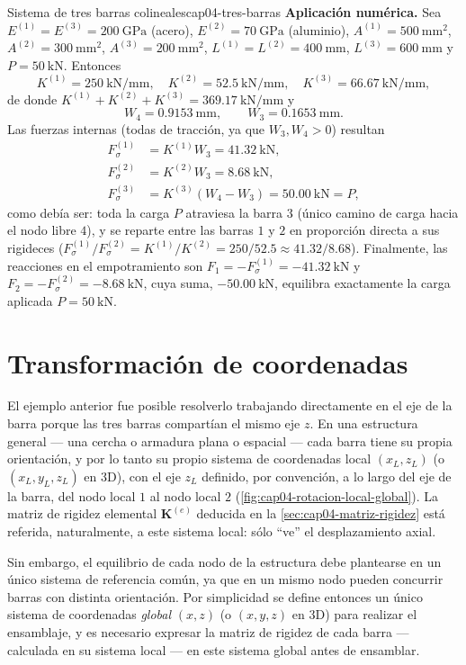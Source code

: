 \begin{ejemplo}{Sistema de tres barras colineales}{cap04-tres-barras}
\textbf{Aplicación numérica.} Sea $E^{(1)}=E^{(3)}=200\ \mathrm{GPa}$ (acero), $E^{(2)}=70\ \mathrm{GPa}$ (aluminio), $A^{(1)}=500\ \mathrm{mm^2}$, $A^{(2)}=300\ \mathrm{mm^2}$, $A^{(3)}=200\ \mathrm{mm^2}$, $L^{(1)}=L^{(2)}=400\ \mathrm{mm}$, $L^{(3)}=600\ \mathrm{mm}$ y $P=50\ \mathrm{kN}$. Entonces
\[
K^{(1)} = 250\ \mathrm{kN/mm}, \quad
K^{(2)} = 52.5\ \mathrm{kN/mm}, \quad
K^{(3)} = 66.67\ \mathrm{kN/mm},
\]
de donde $K^{(1)}+K^{(2)}+K^{(3)}=369.17\ \mathrm{kN/mm}$ y
\[
W_4 = 0.9153\ \mathrm{mm}, \qquad W_3 = 0.1653\ \mathrm{mm} .
\]
Las fuerzas internas (todas de tracción, ya que $W_3,W_4>0$) resultan
\begin{align*}
F_{\sigma}^{(1)} &= K^{(1)}W_3 = 41.32\ \mathrm{kN}, \\
F_{\sigma}^{(2)} &= K^{(2)}W_3 = 8.68\ \mathrm{kN}, \\
F_{\sigma}^{(3)} &= K^{(3)}(W_4-W_3) = 50.00\ \mathrm{kN} = P,
\end{align*}
como debía ser: toda la carga $P$ atraviesa la barra $3$ (único camino de carga hacia el nodo libre $4$), y se reparte entre las barras $1$ y $2$ en proporción directa a sus rigideces ($F_\sigma^{(1)}/F_\sigma^{(2)} = K^{(1)}/K^{(2)} = 250/52.5 \approx 41.32/8.68$). Finalmente, las reacciones en el empotramiento son $F_1=-F_\sigma^{(1)}=-41.32\ \mathrm{kN}$ y $F_2=-F_\sigma^{(2)}=-8.68\ \mathrm{kN}$, cuya suma, $-50.00\ \mathrm{kN}$, equilibra exactamente la carga aplicada $P=50\ \mathrm{kN}$.
\end{ejemplo}

\section{Transformación de coordenadas}
\label{sec:cap04-transformacion-coordenadas}

El ejemplo anterior fue posible resolverlo trabajando directamente en el eje de la barra porque las tres barras compartían el mismo eje $z$. En una estructura general --- una cercha o armadura plana o espacial --- cada barra tiene su propia orientación, y por lo tanto su propio sistema de coordenadas local $(x_L,z_L)$ (o $(x_L,y_L,z_L)$ en 3D), con el eje $z_L$ definido, por convención, a lo largo del eje de la barra, del nodo local $1$ al nodo local $2$ (\cref{fig:cap04-rotacion-local-global}). La matriz de rigidez elemental $\mathbf{K}^{(e)}$ deducida en la \cref{sec:cap04-matriz-rigidez} está referida, naturalmente, a este sistema local: sólo ``ve'' el desplazamiento axial.

Sin embargo, el equilibrio de cada nodo de la estructura debe plantearse en un único sistema de referencia común, ya que en un mismo nodo pueden concurrir barras con distinta orientación. Por simplicidad se define entonces un único sistema de coordenadas \emph{global} $(x,z)$ (o $(x,y,z)$ en 3D) para realizar el ensamblaje, y es necesario expresar la matriz de rigidez de cada barra --- calculada en su sistema local --- en este sistema global antes de ensamblar.

